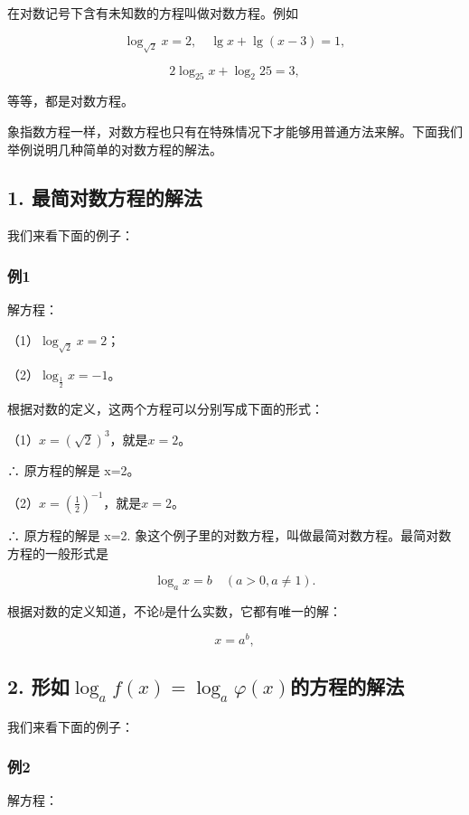 在对数记号下含有未知数的方程叫做对数方程。例如

\[
\log_{\sqrt{2}} x = 2, \quad \lg x + \lg (x - 3) = 1,
\]

\[
2 \log_{25} x + \log_{2} 25 = 3,
\]

等等，都是对数方程。

象指数方程一样，对数方程也只有在特殊情况下才能够用普通方法来解。下面我们举例说明几种简单的对数方程的解法。

\subsection{1. 最简对数方程的解法}

我们来看下面的例子：

\subsubsection{例1}

解方程：

（1）\(\log_{\sqrt{2}} x = 2\)；

（2）\(\log_{\frac{1}{2}} x = -1\)。

 根据对数的定义，这两个方程可以分别写成下面的形式：

（1）\(x = (\sqrt{2})^3\)，就是\(x = 2\)。

∴ 原方程的解是 x=2。

（2）\(x = \left(\frac{1}{2}\right)^{-1}\)，就是\(x = 2\)。

∴ 原方程的解是 x=2.
象这个例子里的对数方程，叫做最简对数方程。最简对数方程的一般形式是

\[
\log_{a} x = b \quad (a > 0, a \neq 1).
\]

根据对数的定义知道，不论\(b\)是什么实数，它都有唯一的解：

\[
x = a^{b},
\]

\subsection{\texorpdfstring{2. 形如\(\log_a f(x) = \log_a \varphi(x)\)的方程的解法}{2. 形如\textbackslash log\_a f(x) = \textbackslash log\_a \textbackslash varphi(x)的方程的解法}}

我们来看下面的例子：

\subsubsection{例2}

解方程：

